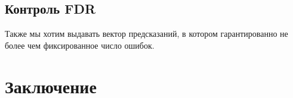 \documentclass{matmex-diploma}
\begin{document}








\subsection{Контроль FDR}

Также мы хотим выдавать вектор предсказаний, в котором гарантированно не более чем фиксированное число ошибок.

\section*{Заключение}



\end{document}
